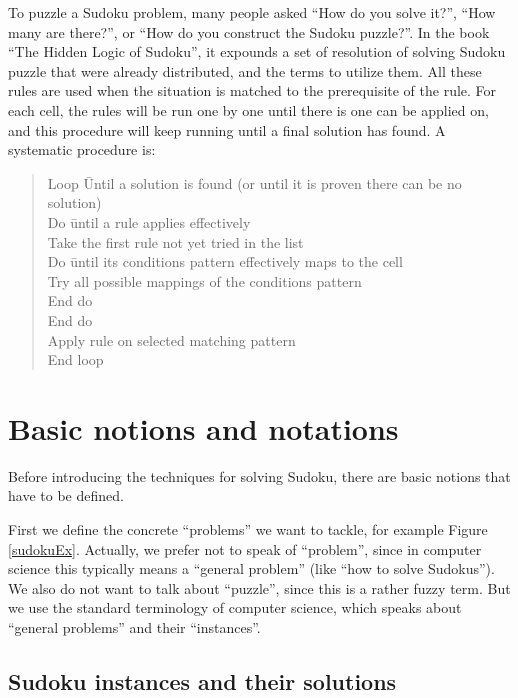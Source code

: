 \documentclass[11pt]{report}
\begin{document}
To puzzle a Sudoku problem, many people asked ``How do you solve it?'', ``How many are there?'', or ``How do you construct the Sudoku puzzle?''. In the book ``The Hidden Logic of Sudoku\cite{Berthier2007Sudoku}'', it expounds a set of resolution of solving Sudoku puzzle that were already distributed, and the terms to utilize them. All these rules are used when the situation is matched to the prerequisite of the rule. For each cell, the rules will be run one by one until there is one can be applied on, and this procedure will keep running until a final solution has found. A systematic procedure is:
\begin{quote}
\begin{tabbing}
Loop \=Until  a solution is found (or until it is proven there can be no solution)\\
\>Do \=until a rule applies  effectively \\
\>\>Take the first rule not yet tried in the list \\
\>\>Do \=until its conditions pattern effectively maps to the cell \\
\>\>\>Try all possible mappings of the conditions pattern \\
\>\>End do\\
\>End do\\
\>Apply rule on selected matching pattern\\
End loop \` \cite[24]{Berthier2007Sudoku}\\
\end{tabbing}
\end{quote}




\chapter{Basic notions and notations}
\label{cha:basicnotnotat}

Before introducing the techniques for solving Sudoku, there are basic notions that have to be defined.

First we define the concrete ``problems'' we want to tackle, for example Figure \ref{sudokuEx}. Actually, we prefer not to speak of ``problem'', since in computer science this typically means a ``general problem'' (like ``how to solve Sudokus''). We also do not want to talk about ``puzzle'', since this is a rather fuzzy term. But we use the standard terminology of computer science, which speaks about ``general problems'' and their ``instances''.


\section{Sudoku instances and their solutions}
\label{sec:Sudokuinstances}
\end{document}
